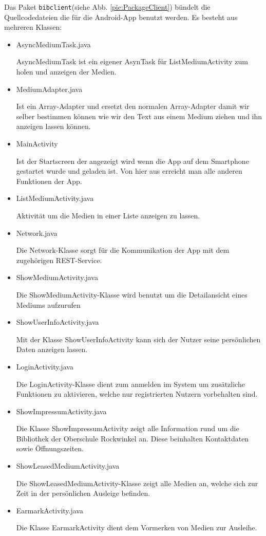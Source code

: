 \documentclass[fontsize=12pt,paper=a4,twoside]{scrartcl}
\begin{document}
Das Paket \texttt{bibclient}(siehe Abb. \vref{pic:PackageClient}) bündelt die Quellcodedateien die für die Android-App benutzt werden. Es besteht aus mehreren Klassen:
\begin{itemize}

\item{AsyncMediumTask.java}

AsyncMediumTask ist ein eigener AsynTask für ListMediumActivity zum holen und anzeigen der Medien.

\item{MediumAdapter.java}

Ist ein Array-Adapter und ersetzt den normalen Array-Adapter damit wir selber bestimmen können wie wir den Text aus einem Medium ziehen und ihn anzeigen lassen können.

\newpage
\item{MainActivity}

Ist der Startscreen der angezeigt wird wenn die App auf dem Smartphone gestartet wurde und geladen ist. Von hier aus erreicht man alle anderen Funktionen der App.

\item{ListMediumActivity.java}

Aktivität um die Medien in einer Liste anzeigen zu lassen.

\item{Network.java}

Die Network-Klasse sorgt für die Kommunikation der App mit dem zugehörigen REST-Service.

\item{ShowMediumActivity.java}

Die ShowMediumActivity-Klasse wird benutzt um die Detailansicht eines Mediums aufzurufen

\item{ShowUserInfoActivity.java}

Mit der Klasse ShowUserInfoActivity kann sich der Nutzer seine persönlichen Daten anzeigen lassen.

\item{LoginActivity.java}

Die LoginActivity-Klasse dient zum anmelden im System um zusätzliche Funktionen zu aktivieren, welche nur registrierten Nutzern vorbehalten sind.

\item{ShowImpressumActivity.java}

Die Klasse ShowImpressumActivity zeigt alle Information rund um die Bibliothek der Oberschule Rockwinkel an. Diese beinhalten Kontaktdaten sowie Öffnungszeiten.

\item{ShowLeasedMediumActivity.java}

Die ShowLeasedMediumActivity-Klasse zeigt alle Medien an, welche sich zur Zeit in der persönlichen Ausleige befinden.

\item{EarmarkActivity.java}

Die Klasse EarmarkActivity dient dem Vormerken von Medien zur Ausleihe.

\end{itemize}
\end{document}
